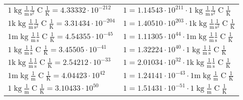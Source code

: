 \begin{center}
\begin{longtable}{l l}
{\color{black}$1 \bm{\mathrm{ }}\operatorname{kg}\frac1{\operatorname{m}}\frac1{\operatorname{s}^2}{\operatorname{C}}\frac1{\operatorname{K}} = 4.33332\cdot10^{-212} $}   & {\color{black}$ 1 = 1.14543\cdot10^{211} \cdot 1 \bm{\mathrm{ }}\operatorname{kg}\frac1{\operatorname{m}}\frac1{\operatorname{s}^2}{\operatorname{C}}\frac1{\operatorname{K}}$}  \\
{\color{gray}$1 \bm{\mathrm{ k}}\operatorname{kg}\frac1{\operatorname{m}}\frac1{\operatorname{s}^2}{\operatorname{C}}\frac1{\operatorname{K}} = 3.31434\cdot10^{-204} $}   & {\color{gray}$ 1 = 1.40510\cdot10^{203} \cdot 1 \bm{\mathrm{ k}}\operatorname{kg}\frac1{\operatorname{m}}\frac1{\operatorname{s}^2}{\operatorname{C}}\frac1{\operatorname{K}}$}  \\
{\color{gray}$1 \bm{\mathrm{ m}}\operatorname{kg}\frac1{\operatorname{m}}\frac1{\operatorname{s}}{\operatorname{C}}\frac1{\operatorname{K}} = 4.54355\cdot10^{-45} $}   & {\color{gray}$ 1 = 1.11305\cdot10^{44} \cdot 1 \bm{\mathrm{ m}}\operatorname{kg}\frac1{\operatorname{m}}\frac1{\operatorname{s}}{\operatorname{C}}\frac1{\operatorname{K}}$}  \\
{\color{black}$1 \bm{\mathrm{ }}\operatorname{kg}\frac1{\operatorname{m}}\frac1{\operatorname{s}}{\operatorname{C}}\frac1{\operatorname{K}} = 3.45505\cdot10^{-41} $}   & {\color{black}$ 1 = 1.32224\cdot10^{40} \cdot 1 \bm{\mathrm{ }}\operatorname{kg}\frac1{\operatorname{m}}\frac1{\operatorname{s}}{\operatorname{C}}\frac1{\operatorname{K}}$}  \\
{\color{gray}$1 \bm{\mathrm{ k}}\operatorname{kg}\frac1{\operatorname{m}}\frac1{\operatorname{s}}{\operatorname{C}}\frac1{\operatorname{K}} = 2.54212\cdot10^{-33} $}   & {\color{gray}$ 1 = 2.01034\cdot10^{32} \cdot 1 \bm{\mathrm{ k}}\operatorname{kg}\frac1{\operatorname{m}}\frac1{\operatorname{s}}{\operatorname{C}}\frac1{\operatorname{K}}$}  \\
{\color{gray}$1 \bm{\mathrm{ m}}\operatorname{kg}\frac1{\operatorname{m}}{}{\operatorname{C}}\frac1{\operatorname{K}} = 4.04423\cdot10^{42} $}   & {\color{gray}$ 1 = 1.24141\cdot10^{-43} \cdot 1 \bm{\mathrm{ m}}\operatorname{kg}\frac1{\operatorname{m}}{}{\operatorname{C}}\frac1{\operatorname{K}}$}  \\
{\color{black}$1 \bm{\mathrm{ }}\operatorname{kg}\frac1{\operatorname{m}}{}{\operatorname{C}}\frac1{\operatorname{K}} = 3.10433\cdot10^{50} $}   & {\color{black}$ 1 = 1.51431\cdot10^{-51} \cdot 1 \bm{\mathrm{ }}\operatorname{kg}\frac1{\operatorname{m}}{}{\operatorname{C}}\frac1{\operatorname{K}}$}  \\

\end{longtable}
\end{center}
